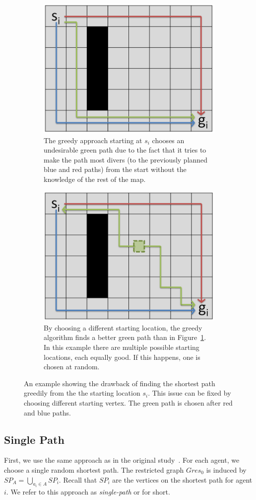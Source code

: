 \begin{figure}[ht]
\centering

\begin{subfigure}[t]{0.99\columnwidth}
\centering
\includegraphics[width=0.45\columnwidth]{img/distant_wrong.PNG}
\caption{The greedy approach starting at $s_i$ chooses an undesirable green path due to the fact that it tries to make the path most divers (to the previously planned blue and red paths) from the start without the knowledge of the rest of the map.} %
\label{fig:distant_wrong}
\end{subfigure}
\hfill
\begin{subfigure}[t]{0.99\columnwidth}
\centering
\includegraphics[width=0.45\columnwidth]{img/distant_ok.PNG}
\caption{By choosing a different starting location, the greedy algorithm finds a better green path than in Figure~\ref{fig:distant_wrong}. In this example there are multiple possible starting locations, each equally good. If this happens, one is chosen at random.}
\label{fig:distant_ok}
\end{subfigure}

\caption{An example showing the drawback of finding the shortest path greedily from the the starting location $s_i$. This issue can be fixed by choosing different starting vertex. The green path is chosen after red and blue paths.}
\label{fig:distant}
\end{figure}

\subsection{Single Path}
First, we use the same approach as in the original study~\cite{AAMAS_corridors}.
For each agent, we choose a single random shortest path. The restricted graph $Gres_{0}$ is induced by $SP_A = \bigcup_{a_i \in A} SP_i$. Recall that $SP_i$ are the vertices on the shortest path for agent $i$. We refer to this approach as \emph{single-path} or \pss{} for short.



